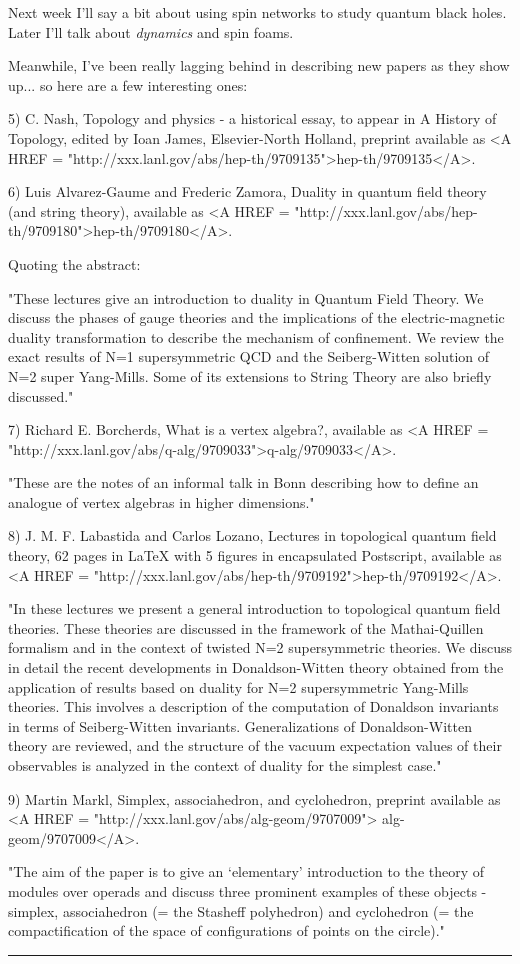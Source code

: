 Next week I'll say a bit about using spin networks to study quantum
black holes.  Later I'll talk about \emph{dynamics} and spin foams.

Meanwhile, I've been really lagging behind in describing new papers as
they show up... so here are a few interesting ones:

5) C. Nash, Topology and physics - a historical essay, to appear in 
A History of Topology, edited by Ioan James, Elsevier-North Holland, 
preprint available as <A HREF = "http://xxx.lanl.gov/abs/hep-th/9709135">hep-th/9709135</A>.  

6) Luis Alvarez-Gaume and Frederic Zamora, Duality in quantum field
theory (and string theory), available as <A HREF = "http://xxx.lanl.gov/abs/hep-th/9709180">hep-th/9709180</A>.

Quoting the abstract: 

"These lectures give an introduction to duality in Quantum Field Theory. We
discuss the phases of gauge theories and the implications of the
electric-magnetic duality transformation to describe the mechanism of
confinement. We review the exact results of N=1 supersymmetric QCD and the
Seiberg-Witten solution of N=2 super Yang-Mills. Some of its extensions to
String Theory are also briefly discussed."

7) Richard E. Borcherds, What is a vertex algebra?, available as
<A HREF = "http://xxx.lanl.gov/abs/q-alg/9709033">q-alg/9709033</A>.

"These are the notes of an informal talk in Bonn describing how to
define an analogue of vertex algebras in higher dimensions."

8) J. M. F. Labastida and Carlos Lozano, Lectures in topological quantum
field theory, 62 pages in LaTeX with 5 figures in encapsulated
Postscript, available as <A HREF = "http://xxx.lanl.gov/abs/hep-th/9709192">hep-th/9709192</A>.

"In these lectures we present a general introduction to topological
quantum field theories. These theories are discussed in the framework of
the Mathai-Quillen formalism and in the context of twisted N=2
supersymmetric theories. We discuss in detail the recent developments in
Donaldson-Witten theory obtained from the application of results based
on duality for N=2 supersymmetric Yang-Mills theories. This involves a
description of the computation of Donaldson invariants in terms of
Seiberg-Witten invariants.  Generalizations of Donaldson-Witten theory
are reviewed, and the structure of the vacuum expectation values of
their observables is analyzed in the context of duality for the simplest
case."

9) Martin Markl, Simplex, associahedron, and cyclohedron, preprint
available as <A HREF = "http://xxx.lanl.gov/abs/alg-geom/9707009">
alg-geom/9707009</A>.

"The aim of the paper is to give an `elementary' introduction to the
theory of modules over operads and discuss three prominent examples of
these objects - simplex, associahedron (= the Stasheff polyhedron) and
cyclohedron (= the compactification of the space of configurations of
points on the circle)."



\par\noindent\rule{\textwidth}{0.4pt}
